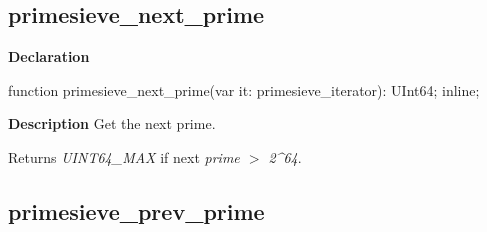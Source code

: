 \documentclass{report}
\newif\ifpdf
\begin{document}
\subsection*{primesieve{\_}next{\_}prime}
\fi
\label{primesieve-primesieve_next_prime}
\begin{list}{}{
\setlength{\itemindent}{0cm}
\setlength{\listparindent}{0cm}
\setlength{\leftmargin}{\evensidemargin}
\addtolength{\leftmargin}{\tmplength}
\settowidth{\labelsep}{X}
\addtolength{\leftmargin}{\labelsep}
\setlength{\labelwidth}{\tmplength}
}
\item[\textbf{Declaration}\hfill]
\ifpdf
\begin{flushleft}
\fi
\begin{ttfamily}
function primesieve{\_}next{\_}prime(var it: primesieve{\_}iterator): UInt64; inline;\end{ttfamily}

\ifpdf
\end{flushleft}
\fi

\par
\item[\textbf{Description}]
Get the next prime.

Returns \textit{UINT64{\_}MAX} if next \textit{prime {$>$} 2{\^{}}64}.

\end{list}
\ifpdf
\subsection*{\large{\textbf{primesieve{\_}prev{\_}prime}}\normalsize\hspace{1ex}\hrulefill}
\else
\end{document}
